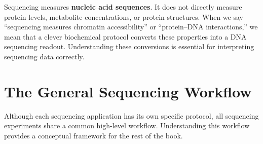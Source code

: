 \begin{warningbox}
Sequencing measures \textbf{nucleic acid sequences}. It does not directly measure protein levels, metabolite concentrations, or protein structures. When we say ``sequencing measures chromatin accessibility'' or ``protein--DNA interactions,'' we mean that a clever biochemical protocol converts these properties into a DNA sequencing readout. Understanding these conversions is essential for interpreting sequencing data correctly.
\end{warningbox}


\section{The General Sequencing Workflow}
\label{sec:intro:general-workflow}

Although each sequencing application has its own specific protocol, all sequencing experiments share a common high-level workflow. Understanding this workflow provides a conceptual framework for the rest of the book.

